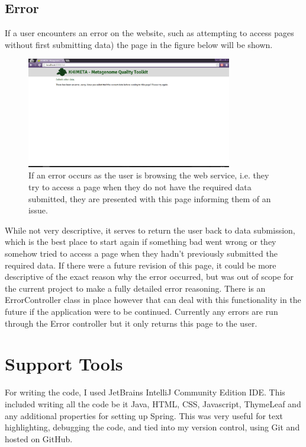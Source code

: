 \subsection{Error}
If a user encounters an error on the website, such as attempting to access pages without first submitting data) the page in the figure below will be shown.
\begin{figure}[H]
	\centering
\includegraphics[width=0.8\textwidth]{images/ui10}
\caption{If an error occurs as the user is browsing the web service, i.e. they try to access a page when they do not have the required data submitted, they are presented with this page informing them of an issue.}
\end{figure}
While not very descriptive, it serves to return the user back to data submission, which is the best place to start again if something bad went wrong or they somehow tried to access a page when they hadn't previously submitted the required data. If there were a future revision of this page, it could be more descriptive of the exact reason why the error occurred, but was out of scope for the current project to make a fully detailed error reasoning. There is an ErrorController class in place however that can deal with this functionality in the future if the application were to be continued. Currently any errors are run through the Error controller but it only returns this page to the user.

\section{Support Tools}
For writing the code, I used JetBrains IntelliJ Community Edition IDE. This included writing all the code be it Java, HTML, CSS, Javascript, ThymeLeaf and any additional properties for setting up Spring. This was very useful for text highlighting, debugging the code, and tied into my version control, using Git and hosted on GitHub.

